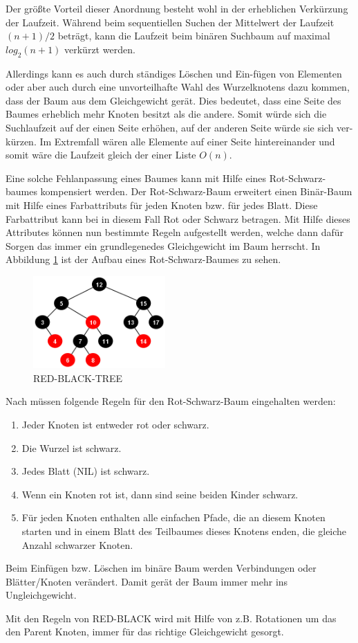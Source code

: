 Der größte Vorteil dieser Anordnung besteht wohl in der erheblichen Verkürzung der Laufzeit. Während beim sequentiellen Suchen der Mittelwert der Laufzeit $(n+1)/2$ beträgt, kann die Laufzeit beim binären Suchbaum auf maximal $log_2(n+1)$ verkürzt werden.

Allerdings kann es auch durch ständiges Löschen und Ein-fügen von Elementen oder aber auch durch eine unvorteilhafte Wahl des Wurzelknotens dazu kommen, dass der Baum aus dem Gleichgewicht gerät. Dies bedeutet, dass eine Seite des Baumes erheblich mehr Knoten besitzt als die andere. Somit würde sich die Suchlaufzeit auf der einen Seite erhöhen, auf der anderen Seite würde sie sich ver-kürzen. Im Extremfall wären alle Elemente auf einer Seite hintereinander und somit wäre die Laufzeit gleich der einer Liste $O(n)$.

Eine solche Fehlanpassung eines Baumes kann mit Hilfe eines Rot-Schwarz-baumes kompensiert werden.
Der Rot-Schwarz-Baum erweitert einen Binär-Baum mit Hilfe eines Farbattributs für jeden Knoten bzw. für jedes Blatt. Diese Farbattribut kann bei in diesem Fall Rot oder Schwarz betragen. Mit Hilfe dieses Attributes können nun bestimmte Regeln aufgestellt werden, welche dann dafür Sorgen das immer ein grundlegenedes Gleichgewicht im Baum herrscht. In Abbildung \ref{fig:rbtree} ist der Aufbau eines Rot-Schwarz-Baumes zu sehen.

\begin{figure}[h]
	\centering
	\includegraphics[width=0.45\textwidth]{pictures/redblacktree.png}
	\caption{RED-BLACK-TREE~\protect\cite{rtoal}}
	\label{fig:rbtree}
\end{figure}

 
Nach \cite[S.311]{tcormen} müssen folgende Regeln für den Rot-Schwarz-Baum eingehalten werden:

\begin{enumerate}
	\item Jeder Knoten ist entweder rot oder schwarz.
	\item Die Wurzel ist schwarz.
	\item Jedes Blatt (NIL) ist schwarz.
	\item Wenn ein Knoten rot ist, dann sind seine beiden Kinder schwarz.
	\item Für jeden Knoten enthalten alle einfachen Pfade, die an diesem Knoten starten und in einem Blatt des Teilbaumes dieses Knotens enden, die gleiche Anzahl schwarzer Knoten. 
\end{enumerate}


Beim Einfügen bzw. Löschen im binäre Baum werden Verbindungen oder Blätter/Knoten verändert. Damit gerät der Baum immer mehr ins Ungleichgewicht. 

Mit den Regeln von RED-BLACK wird mit Hilfe von z.B. Rotationen um das den Parent Knoten, immer für das richtige Gleichgewicht gesorgt.